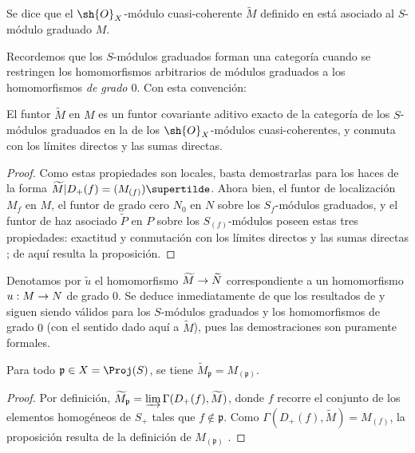 \documentclass[oneside,10pt]{amsart}
\makeatletter
\newcommand{\ega@arrow}[2]{\mathchoice{#1}{#2}{#2}{#2}}
\renewcommand{\to}{\ega@arrow{\longrightarrow}{\rightarrow}}
\let\EGAOriginalLabel\label
\renewcommand{\label}[1]{\phantomsection\EGAOriginalLabel{#1}}
\makeatother
\begin{document}
\begin{definition}[2.5.3]
\label{II.2.5.3}
Se dice que el $\sh{O}_X$-módulo cuasi-coherente $\widetilde{M}$ definido en  está asociado al $S$-módulo graduado $M$.
\end{definition}

Recordemos que los $S$-módulos graduados forman una categoría cuando se restringen los homomorfismos arbitrarios de módulos graduados a los homomorfismos \emph{de grado $0$}.
Con esta convención:

\begin{proposition}[2.5.4]
\label{II.2.5.4}
El funtor $\widetilde{M}$ en $M$ es un funtor covariante aditivo exacto de la categoría de los $S$-módulos graduados en la de los $\sh{O}_X$-módulos cuasi-coherentes, y conmuta con los límites directos y las sumas directas.
\end{proposition}

\begin{proof}
Como estas propiedades son locales, basta demostrarlas para los haces de la forma $\widetilde{M}|D_+(f)=(M_{(f)})\supertilde$.
Ahora bien, el funtor de localización $M_f$ en $M$, el funtor de grado cero $N_0$ en $N$ sobre los $S_f$-módulos graduados, y el funtor de haz asociado $\widetilde{P}$ en $P$ sobre los $S_{(f)}$-módulos poseen estas tres propiedades: exactitud y conmutación con los límites directos y las sumas directas  ; de aquí resulta la proposición.
\end{proof}

Denotamos por $\widetilde{u}$ el homomorfismo $\widetilde{M}\to\widetilde{N}$ correspondiente a un homomorfismo $u:M\to N$ de grado $0$.
Se deduce inmediatamente de  que los resultados de  y  siguen siendo válidos para los $S$-módulos graduados y los homomorfismos de grado $0$ (con el sentido dado aquí a $\widetilde{M}$), pues las demostraciones son puramente formales.

\begin{proposition}[2.5.5]
\label{II.2.5.5}
Para todo $\mathfrak{p}\in X=\Proj(S)$, se tiene $\widetilde{M}_\mathfrak{p}=M_{(\mathfrak{p})}$.
\end{proposition}

\begin{proof}
Por definición, $\widetilde{M}_\mathfrak{p}=\varinjlim\Gamma(D_+(f),\widetilde{M})$, donde $f$ recorre el conjunto de los elementos homogéneos de $S_+$ tales que $f\notin\mathfrak{p}$.
Como $\Gamma(D_+(f),\widetilde{M})=M_{(f)}$, la proposición resulta de la definición de $M_{(\mathfrak{p})}$ .
\end{proof}
\end{document}
